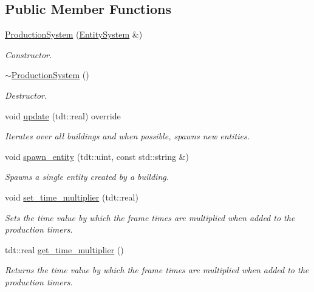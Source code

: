 \subsection*{Public Member Functions}
\begin{DoxyCompactItemize}
\item 
\hyperlink{class_production_system_a0714612f29ebaca91f6cd750062f4090}{Production\+System} (\hyperlink{class_entity_system}{Entity\+System} \&)
\begin{DoxyCompactList}\small\item\em Constructor. \end{DoxyCompactList}\item 
\hyperlink{class_production_system_a65622ad0ab7cb6e3ea0b260697ab5928}{$\sim$\+Production\+System} ()
\begin{DoxyCompactList}\small\item\em Destructor. \end{DoxyCompactList}\item 
void \hyperlink{class_production_system_ad8d47ea05eeb8504a58c2f68f9285c35}{update} (tdt\+::real) override
\begin{DoxyCompactList}\small\item\em Iterates over all buildings and when possible, spawns new entities. \end{DoxyCompactList}\item 
void \hyperlink{class_production_system_a285816be3e143ec79a330e7af5ad3eca}{spawn\+\_\+entity} (tdt\+::uint, const std\+::string \&)
\begin{DoxyCompactList}\small\item\em Spawns a single entity created by a building. \end{DoxyCompactList}\item 
void \hyperlink{class_production_system_a189615e653da1dc7773efe1ca2c98863}{set\+\_\+time\+\_\+multiplier} (tdt\+::real)
\begin{DoxyCompactList}\small\item\em Sets the time value by which the frame times are multiplied when added to the production timers. \end{DoxyCompactList}\item 
tdt\+::real \hyperlink{class_production_system_abf59007923dc29a23db218200e0b75d9}{get\+\_\+time\+\_\+multiplier} ()
\begin{DoxyCompactList}\small\item\em Returns the time value by which the frame times are multiplied when added to the production timers. \end{DoxyCompactList}\end{DoxyCompactItemize}
